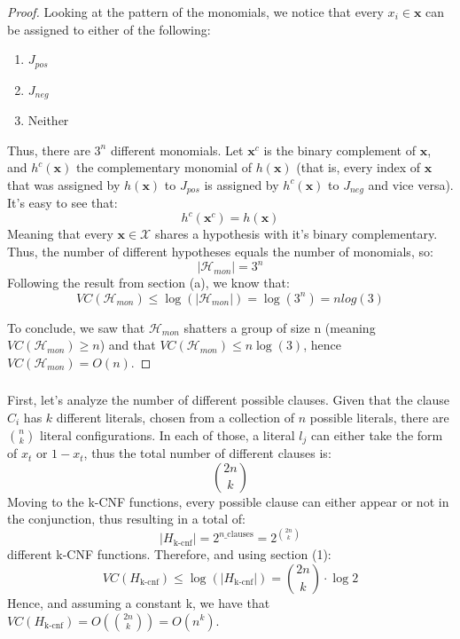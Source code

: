 \begin{proof}
    Looking at the pattern of the monomials, we notice that every $x_i \in \boldsymbol{x}$ can be assigned to either of the following:
    \begin{enumerate}
        \item $J_{pos}$
        \item $J_{neg}$
        \item Neither
    \end{enumerate}
    Thus, there are $3^n$ different monomials. 
    Let $\boldsymbol{x}^c$ is the binary complement of $\boldsymbol{x}$, and $h^c(\boldsymbol{x})$ the complementary monomial of $h(\boldsymbol{x})$ (that is, every index of $\boldsymbol{x}$ that was assigned by $h(\boldsymbol{x})$ to $J_{pos}$ is assigned by $h^c(\boldsymbol{x})$ to $J_{neg}$ and vice versa).
    It's easy to see that:
    \begin{equation*}
        h^c(\boldsymbol{x}^c) = h(\boldsymbol{x})
    \end{equation*}
    Meaning that every $\boldsymbol{x} \in \mathcal{X}$ shares a hypothesis with it's binary complementary. Thus, the number of different hypotheses equals the number of monomials, so:
    \begin{equation*}
        |\mathcal{H}_{mon}| = 3^n
    \end{equation*}
    Following the result from section (a), we know that:
    \begin{equation*}
        VC(\mathcal{H}_{mon}) \leq \log(|\mathcal{H}_{mon}|) = \log(3^n) = n log(3)
    \end{equation*}
    
    To conclude, we saw that $\mathcal{H}_{mon}$ shatters a group of size n (meaning $VC(\mathcal{H}_{mon}) \geq n$) and that $VC(\mathcal{H}_{mon}) \leq n\log(3)$, hence $VC(\mathcal{H}_{mon}) = O(n)$.
\end{proof}

\subsubsection{}
First, let's analyze the number of different possible clauses. Given that the clause $C_i$ has $k$ different literals, chosen from a collection of $n$ possible literals, there are $n \choose k$ literal configurations. In each of those, a literal $l_j$ can either take the form of $x_t$ or $1-x_t$, thus the total number of different clauses is:
\begin{equation*}
    {2n \choose k}
\end{equation*}
Moving to the k-CNF functions, every possible clause can either appear or not in the conjunction, thus resulting in a total of:
\begin{equation*}
    |H_{\text{k-cnf}}| = 2^{n\_{\text{clauses}}} = 2^{2n \choose k}
\end{equation*}
different k-CNF functions. Therefore, and using section (1):
\begin{equation*}
    VC(H_{\text{k-cnf}}) \leq \log(|H_{\text{k-cnf}}|) = {2n \choose k} \cdot \log 2
\end{equation*}
Hence, and assuming a constant k, we have that $VC(H_{\text{k-cnf}}) = O({2n \choose k}) = O(n^k)$.